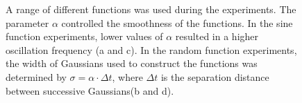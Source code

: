 \documentclass[a4paper,11pt]{article}
\begin{document}
\begin{figure}[]


\caption{A range of different functions was used during the experiments. The
parameter $\alpha$ controlled the smoothness of the functions. In the sine
function experiments, lower values of $\alpha$ resulted in a higher oscillation
frequency (a and c). In the random function experiments, the width of Gaussians
used to construct the functions was determined by $\sigma=\alpha\cdot\Delta t$,
where $\Delta t$ is the separation distance between successive
Gaussians(b and d).}

\end{figure}
\end{document}
